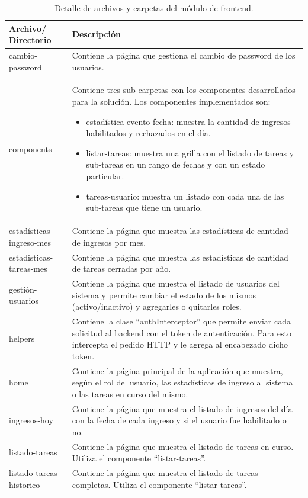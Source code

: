 \begin{table}[h]
	\centering
	\caption[Carpetas frontend ]{Detalle de archivos y carpetas del módulo de frontend.}
	\begin{tabular}{p{2.3cm} p{10.7cm}} 	
		\toprule
		\textbf{Archivo/
		Directorio} & 
		\textbf{Descripción} 
		\\
		\midrule
cambio-password & Contiene la página que gestiona el cambio de password de los usuarios. \\
components & Contiene tres sub-carpetas con los componentes desarrollados para la solución. Los componentes implementados son:
\begin{itemize}
\item estadística-evento-fecha: muestra la cantidad de ingresos habilitados y rechazados en el día.
\item listar-tareas: muestra una grilla con el listado de tareas y sub-tareas en un rango de fechas y con un estado particular. 
\item tareas-usuario: muestra un listado con cada una de las sub-tareas que tiene un usuario.
\end{itemize} \\
estadísticas-ingreso-mes & Contiene la página que muestra las estadísticas de cantidad de ingresos por mes.\\
estadisticas-tareas-mes & Contiene la página que muestra las estadísticas de cantidad de tareas cerradas por año.\\
gestión-usuarios & Contiene la página que muestra el listado de usuarios del sistema y permite cambiar el estado de los mismos (activo/inactivo) y agregarles o quitarles roles. \\
helpers & Contiene la clase ``authInterceptor'' que permite enviar cada solicitud al backend con el token de autenticación. Para esto intercepta el pedido HTTP y le agrega al encabezado dicho token. \\
home & Contiene la página principal de la aplicación que muestra, según el rol del usuario, las estadísticas de ingreso al sistema o las tareas en curso del mismo.\\
ingresos-hoy & Contiene la página que muestra el listado de ingresos del día con la fecha de cada ingreso y si el usuario fue habilitado o no. \\
listado-tareas & Contiene la página que muestra el listado de tareas en curso. Utiliza el componente ``listar-tareas''. \\
listado-tareas
-historico & Contiene la página que muestra el listado de tareas completas. Utiliza el componente ``listar-tareas''. \\

\end{tabular}
\end{table}
